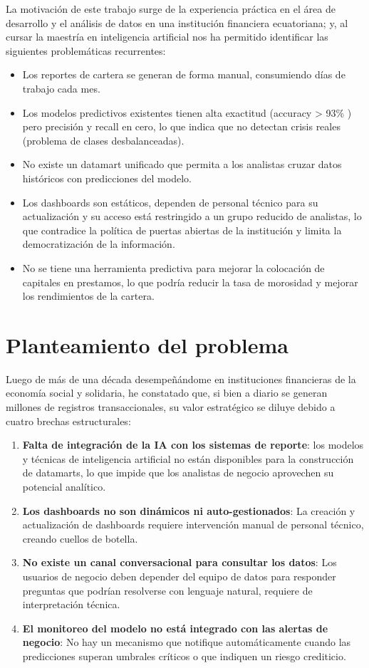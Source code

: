 La motivación de este trabajo surge de la experiencia práctica en el área de desarrollo y el análisis de datos en una institución financiera ecuatoriana; y, al cursar la maestría en inteligencia artificial nos ha permitido identificar las siguientes problemáticas recurrentes:

\begin{itemize}
    \item Los reportes de cartera se generan de forma manual, consumiendo días de trabajo cada mes.
    \item  Los modelos predictivos existentes tienen alta exactitud (accuracy > 93\% ) pero precisión y recall en cero, lo que indica que no detectan crisis reales (problema de clases desbalanceadas).
    \item  No existe un datamart unificado que permita a los analistas cruzar datos históricos con predicciones del modelo.
    \item  Los dashboards son estáticos, dependen de personal técnico para su actualización y su acceso está restringido a un grupo reducido de analistas, lo que contradice la política de puertas abiertas de la institución y limita la democratización de la información.
    \item  No se tiene una herramienta predictiva para mejorar la colocación de capitales en prestamos, lo que podría reducir la tasa de morosidad y mejorar los rendimientos de la cartera.   
\end{itemize}

\section{Planteamiento del problema}

Luego de más de una década desempeñándome en instituciones financieras de la economía social y solidaria, he constatado que, si bien a diario se generan millones de registros transaccionales, su valor estratégico se diluye debido a cuatro brechas estructurales:

\begin{enumerate}
    \item \textbf{Falta de integración de la IA con los sistemas de reporte}: los modelos y técnicas de inteligencia artificial no están disponibles para la construcción de datamarts, lo que impide que los analistas de negocio aprovechen su potencial analítico.
    \item \textbf{Los dashboards no son dinámicos ni auto-gestionados}: La creación y actualización de dashboards requiere intervención manual de personal técnico, creando cuellos de botella.
    \item \textbf{No existe un canal conversacional para consultar los datos}: Los usuarios de negocio deben depender del equipo de datos para responder preguntas que podrían resolverse con lenguaje natural, requiere de interpretación técnica.
    \item \textbf{El monitoreo del modelo no está integrado con las alertas de negocio}: No hay un mecanismo que notifique automáticamente cuando las predicciones superan umbrales críticos o que indiquen un riesgo crediticio.
\end{enumerate}

